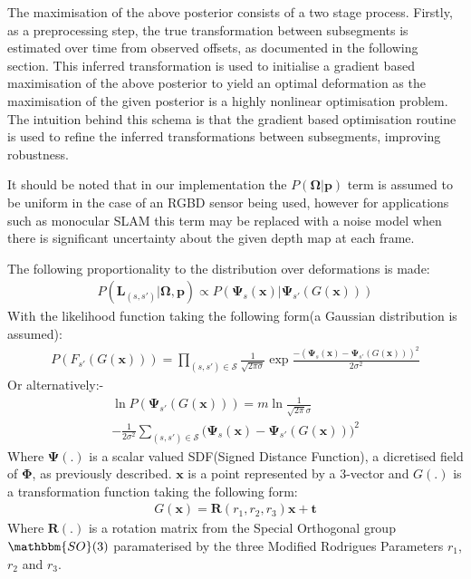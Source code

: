 The maximisation of the above posterior consists of a two stage process. Firstly, as a preprocessing step, the true transformation between 
subsegments is estimated over time from observed offsets, as documented in the following section. This inferred transformation is used to 
initialise a gradient based maximisation of the above posterior to yield an optimal deformation as the maximisation of the given posterior is 
a highly nonlinear optimisation problem. The intuition behind this schema is that the 
gradient based optimisation routine is used to refine the inferred transformations between subsegments, improving robustness.

It should be noted that in our implementation the $P(\mathbf{\Omega} | \mathbf{p})$ term is assumed to be uniform in the case of an 
RGBD sensor being used, however for applications such as monocular SLAM this term may be replaced with a noise model when there is 
significant uncertainty about the given depth map at each frame.

The following proportionality to the distribution over deformations is made:
\begin{equation}
\begin{split}
P(\mathbf{L}_{(s, s')} | \mathbf{\Omega}, \mathbf{p}) \propto P(\mathbf{\Psi}_{s}(\mathbf{x}) | \mathbf{\Psi}_{s'}(G(\mathbf{x})))
\end{split}
\end{equation}
With the likelihood function taking the following form(a Gaussian distribution is assumed):
\begin{equation}
\begin{split}
P(F_{s'}(G(\mathbf{x}))) = \prod_{(s, s') \in \mathcal{S}} \frac{1}{\sqrt{2 \pi \sigma}} \exp{\frac{-(\mathbf{\Psi}_{s}(\mathbf{x}) - \mathbf{\Psi}_{s'}(G(\mathbf{x})))^2}{2\sigma^2}}
\end{split}
\end{equation}
Or alternatively:-
\begin{equation}
\begin{split}
\ln P(\mathbf{\Psi}_{s'}(G(\mathbf{x}))) = m\ln\frac{1}{\sqrt{2\pi}\sigma}\\
-\frac{1}{2\sigma^2} \sum_{(s, s') \in \mathcal{S}} \bigg( \mathbf{\Psi}_{s}(\mathbf{x}) - \mathbf{\Psi}_{s'}(G(\mathbf{x})) \bigg)^2
\end{split}
\end{equation}
Where $\mathbf{\Psi}(.)$ is a scalar valued SDF(Signed Distance Function), a dicretised field of $\mathbf{\Phi}$, as previously described. $\mathbf{x}$ is a point represented by a 3-vector and $G(.)$ is a transformation function taking the following form:
\begin{equation}
\begin{split}
G(\mathbf{x}) = \mathbf{R}(r_{1}, r_{2}, r_{3})\mathbf{x} + \mathbf{t}
\end{split}
\end{equation}
Where $\mathbf{R}(.)$ is a rotation matrix from the Special Orthogonal group $\mathbbm{SO}(3)$ paramaterised by the three Modified 
Rodrigues Parameters\cite{Shuster1993} $r_{1}$, $r_{2}$ and $r_{3}$.

